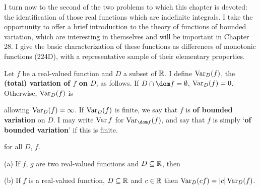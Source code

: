 
\def\chaptername{The Fundamental Theorem of Calculus}
\def\sectionname{Functions of bounded variation}


I turn now to the second of the two problems to which this chapter is
devoted:  the identification of those real functions which are
indefinite integrals.   I take the opportunity to offer a brief
introduction to the theory of functions of bounded variation, which are
interesting in themselves and will be important in Chapter 28.   I give
the
basic characterization of these functions as differences of monotonic
functions (224D), with a representative sample of their elementary
properties.

 Let $f$ be a
real-valued function  and  $D$ a subset of $\Bbb R$.   I define
$\mathop{\text{Var}}_D(f)$, the {\bf (total) variation of $f$ on $D$}, as follows.   If
$D\cap\dom f=\emptyset$, $\mathop{\text{Var}}_D(f)=0$.   Otherwise, $\mathop{\text{Var}}_D(f)$ is


\noindent allowing $\mathop{\text{Var}}_{D}(f)=\infty$.
If $\mathop{\text{Var}}_{D}(f)$ is finite, we say that $f$ is {\bf of bounded
variation} on $D$.    I may write
$\mathop{\text{Var}} f$ for $\Var_{\dom f}(f)$, and say that $f$ is simply `{\bf of
bounded variation}' if this is finite.



\noindent for all $D$, $f$.

 (a) If $f$, $g$ are two real-valued functions
and $D\subseteq\Bbb R$, then


(b) If $f$ is a real-valued function, $D\subseteq\Bbb R$ and
$c\in\Bbb R$ then $\mathop{\text{Var}}_{D}(cf)=|c|\mathop{\text{Var}}_{D}(f)$.

